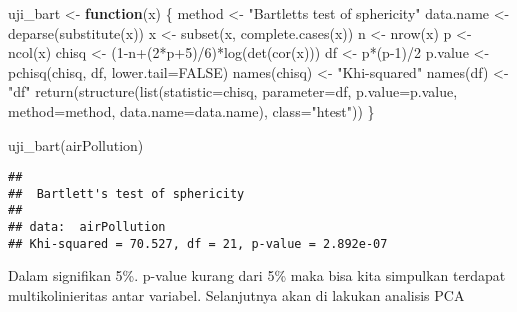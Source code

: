 \documentclass[
]{article}
\newenvironment{Shaded}{\begin{snugshade}}{\end{snugshade}}
\newcommand{\AttributeTok}[1]{\textcolor[rgb]{0.77,0.63,0.00}{#1}}
\newcommand{\ConstantTok}[1]{\textcolor[rgb]{0.00,0.00,0.00}{#1}}
\newcommand{\ControlFlowTok}[1]{\textcolor[rgb]{0.13,0.29,0.53}{\textbf{#1}}}
\newcommand{\DecValTok}[1]{\textcolor[rgb]{0.00,0.00,0.81}{#1}}
\newcommand{\FunctionTok}[1]{\textcolor[rgb]{0.00,0.00,0.00}{#1}}
\newcommand{\NormalTok}[1]{#1}
\newcommand{\OtherTok}[1]{\textcolor[rgb]{0.56,0.35,0.01}{#1}}
\newcommand{\SpecialCharTok}[1]{\textcolor[rgb]{0.00,0.00,0.00}{#1}}
\newcommand{\StringTok}[1]{\textcolor[rgb]{0.31,0.60,0.02}{#1}}
\begin{document}
\begin{Shaded}
\begin{Highlighting}[]
\NormalTok{uji\_bart }\OtherTok{\textless{}{-}} \ControlFlowTok{function}\NormalTok{(x)}
\NormalTok{\{}
\NormalTok{ method }\OtherTok{\textless{}{-}} \StringTok{"Bartlett\textquotesingle{}s test of sphericity"}
\NormalTok{ data.name }\OtherTok{\textless{}{-}} \FunctionTok{deparse}\NormalTok{(}\FunctionTok{substitute}\NormalTok{(x))}
\NormalTok{ x }\OtherTok{\textless{}{-}} \FunctionTok{subset}\NormalTok{(x, }\FunctionTok{complete.cases}\NormalTok{(x)) }
\NormalTok{ n }\OtherTok{\textless{}{-}} \FunctionTok{nrow}\NormalTok{(x)}
\NormalTok{ p }\OtherTok{\textless{}{-}} \FunctionTok{ncol}\NormalTok{(x)}
\NormalTok{ chisq }\OtherTok{\textless{}{-}}\NormalTok{ (}\DecValTok{1}\SpecialCharTok{{-}}\NormalTok{n}\SpecialCharTok{+}\NormalTok{(}\DecValTok{2}\SpecialCharTok{*}\NormalTok{p}\SpecialCharTok{+}\DecValTok{5}\NormalTok{)}\SpecialCharTok{/}\DecValTok{6}\NormalTok{)}\SpecialCharTok{*}\FunctionTok{log}\NormalTok{(}\FunctionTok{det}\NormalTok{(}\FunctionTok{cor}\NormalTok{(x)))}
\NormalTok{ df }\OtherTok{\textless{}{-}}\NormalTok{ p}\SpecialCharTok{*}\NormalTok{(p}\DecValTok{{-}1}\NormalTok{)}\SpecialCharTok{/}\DecValTok{2}
\NormalTok{ p.value }\OtherTok{\textless{}{-}} \FunctionTok{pchisq}\NormalTok{(chisq, df, }\AttributeTok{lower.tail=}\ConstantTok{FALSE}\NormalTok{)}
 \FunctionTok{names}\NormalTok{(chisq) }\OtherTok{\textless{}{-}} \StringTok{"Khi{-}squared"}
 \FunctionTok{names}\NormalTok{(df) }\OtherTok{\textless{}{-}} \StringTok{"df"}
 \FunctionTok{return}\NormalTok{(}\FunctionTok{structure}\NormalTok{(}\FunctionTok{list}\NormalTok{(}\AttributeTok{statistic=}\NormalTok{chisq, }\AttributeTok{parameter=}\NormalTok{df, }\AttributeTok{p.value=}\NormalTok{p.value, }\AttributeTok{method=}\NormalTok{method, }\AttributeTok{data.name=}\NormalTok{data.name), }\AttributeTok{class=}\StringTok{"htest"}\NormalTok{))}
\NormalTok{\}}

\FunctionTok{uji\_bart}\NormalTok{(airPollution)}
\end{Highlighting}
\end{Shaded}

\begin{verbatim}
## 
##  Bartlett's test of sphericity
## 
## data:  airPollution
## Khi-squared = 70.527, df = 21, p-value = 2.892e-07
\end{verbatim}

Dalam signifikan 5\%. p-value kurang dari 5\% maka bisa kita simpulkan
terdapat multikolinieritas antar variabel. Selanjutnya akan di lakukan
analisis PCA
\end{document}
